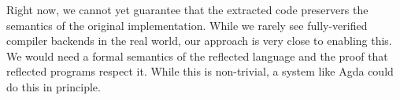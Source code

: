 \documentclass[sigplan,anonymous,review]{acmart}
\newcommand{\AK}[1]{\AgdaKeyword{#1}}
\begin{document}
Right now, we cannot yet guarantee that the
extracted code preservers the semantics of the original
implementation. While we rarely see
fully-verified compiler backends in the real world,
our approach is very close to enabling this.
We would need a formal semantics of the reflected language
and the proof that reflected programs respect it.
While this is non-trivial, a system like Agda could do
this in principle.

% 



\end{document}
